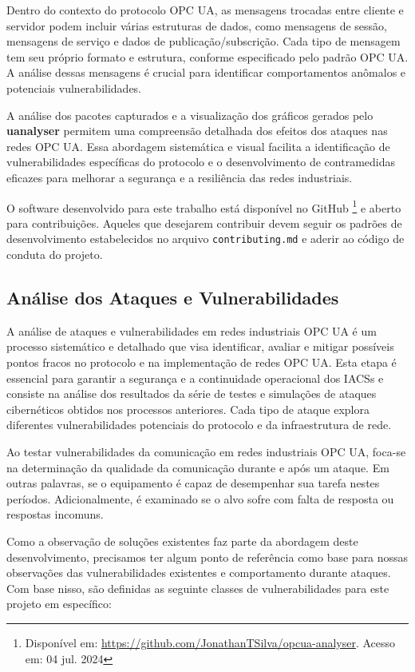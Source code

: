     Dentro do contexto do protocolo OPC UA, as mensagens trocadas entre cliente e servidor podem incluir várias estruturas de dados, como mensagens de sessão, mensagens de serviço e dados de publicação/subscrição. Cada tipo de mensagem tem seu próprio formato e estrutura, conforme especificado pelo padrão OPC UA. A análise dessas mensagens é crucial para identificar comportamentos anômalos e potenciais vulnerabilidades.

    A análise dos pacotes capturados e a visualização dos gráficos gerados pelo \textbf{uanalyser} permitem uma compreensão detalhada dos efeitos dos ataques nas redes OPC UA. Essa abordagem sistemática e visual facilita a identificação de vulnerabilidades específicas do protocolo e o desenvolvimento de contramedidas eficazes para melhorar a segurança e a resiliência das redes industriais.

    O software desenvolvido para este trabalho está disponível no GitHub \footnote{Disponível em: \url{https://github.com/JonathanTSilva/opcua-analyser}. Acesso em: 04 jul. 2024} e aberto para contribuições. Aqueles que desejarem contribuir devem seguir os padrões de desenvolvimento estabelecidos no arquivo \texttt{contributing.md} e aderir ao código de conduta do projeto.

    \subsection{Análise dos Ataques e Vulnerabilidades}

    A análise de ataques e vulnerabilidades em redes industriais OPC UA é um processo sistemático e detalhado que visa identificar, avaliar e mitigar possíveis pontos fracos no protocolo e na implementação de redes OPC UA. Esta etapa é essencial para garantir a segurança e a continuidade operacional dos IACSs e consiste na análise dos resultados da série de testes e simulações de ataques cibernéticos obtidos nos processos anteriores. Cada tipo de ataque explora diferentes vulnerabilidades potenciais do protocolo e da infraestrutura de rede.

    Ao testar vulnerabilidades da comunicação em redes industriais OPC UA, foca-se na determinação da qualidade da comunicação durante e após um ataque. Em outras palavras, se o equipamento é capaz de desempenhar sua tarefa nestes períodos. Adicionalmente, é examinado se o alvo sofre com falta de resposta ou respostas incomuns.

    Como a observação de soluções existentes faz parte da abordagem deste desenvolvimento, precisamos ter algum ponto de referência como base para nossas observações das vulnerabilidades existentes e comportamento durante ataques. Com base nisso, são definidas as seguinte classes de vulnerabilidades para este projeto em específico:

